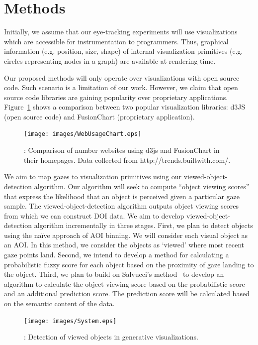 \section{Methods}
\label{sec:DOICollectionMethods}
Initially, we assume that our eye-tracking experiments will use visualizations which are accessible for instrumentation to programmers. Thus, graphical information (e.g. position, size, shape) of internal visualization primitives (e.g. circles representing nodes in a graph) are available at rendering time. 

Our proposed methods will only operate over visualizations with open source code. Such scenario is a limitation of our work. However, we claim that open source code libraries are gaining popularity over proprietary applications. Figure~\ref{fig:WebUsageChart} shows a comparison between two popular visualization libraries: d3JS (open source code) and FusionChart (proprietary application).

\begin{figure}[htb]
  \centering
  \texttt{[image: images/WebUsageChart.eps]}
  \caption{: Comparison of number websites using d3js and FusionChart in their homepages. Data collected from http://trends.builtwith.com/. }
	\label{fig:WebUsageChart}
\end{figure}

We aim to map gazes to visualization primitives using our viewed-object-detection algorithm. Our algorithm will seek to compute ``object viewing scores'' that express the likelihood that an object is perceived given a particular gaze sample. The viewed-object-detection algorithm outputs object viewing scores from which we can construct DOI data. We aim to develop viewed-object-detection algorithm incrementally in three stages. First, we plan to detect objects using the na\"{i}ve approach of AOI binning. We will consider each visual object as an AOI. In this method, we consider the objects as `viewed' where most recent gaze points land. Second, we intend to develop a method for calculating a probabilistic fuzzy score for each object based on the proximity of gaze landing to the object. Third, we plan to build on Salvucci's method~\cite{Sal00} to develop an algorithm to calculate the object viewing score based on the probabilistic score and an additional prediction score. The prediction score will be calculated based on the semantic content of the data. 

\begin{figure}[htb]
  \centering
  \texttt{[image: images/System.eps]}
  \caption{: Detection of viewed objects in generative visualizations.}
	\label{fig:System}
\end{figure}

